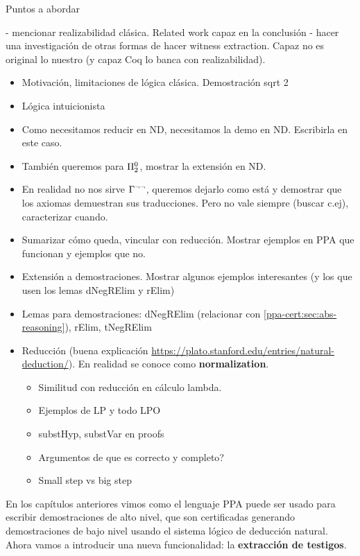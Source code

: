 Puntos a abordar

- mencionar realizabilidad clásica. Related work capaz en la conclusión
- hacer una investigación de otras formas de hacer witness extraction. Capaz no es original lo nuestro (y capaz Coq lo banca con realizabilidad).

\begin{itemize}
    \item Motivación, limitaciones de lógica clásica. Demostración sqrt 2
    \item Lógica intuicionista
    \item Como necesitamos reducir en ND, necesitamos la demo en ND. Escribirla
    en este caso.
    \item También queremos para $\Pi^0_2$, mostrar la extensión en ND.
    \item En realidad no nos sirve $\Gamma^{\neg\neg}$, queremos dejarlo como
    está y demostrar que los axiomas demuestran sus traducciones. Pero no vale
    siempre (buscar c.ej), caracterizar cuando.
    \item Sumarizar cómo queda, vincular con reducción. Mostrar ejemplos en PPA
    que funcionan y ejemplos que no.
    \item Extensión a demostraciones. Mostrar algunos ejemplos interesantes (y
    los que usen los lemas dNegRElim y rElim)
    \item Lemas para demostraciones: dNegRElim (relacionar con \ref{ppa-cert:sec:abs-reasoning}), rElim, tNegRElim
    \item Reducción (buena explicación
    \url{https://plato.stanford.edu/entries/natural-deduction/}). En realidad se
    conoce como \textbf{normalization}.
    \begin{itemize}
        \item Similitud con reducción en cálculo lambda.
        \item Ejemplos de LP y todo LPO
        \item substHyp, substVar en proofs
        \item Argumentos de que es correcto y completo?
        \item Small step vs big step
    \end{itemize}
\end{itemize}

\newpage

En los capítulos anteriores vimos como el lenguaje PPA puede ser usado para
escribir demostraciones de alto nivel, que son certificadas generando
demostraciones de bajo nivel usando el sistema lógico de deducción natural.
Ahora vamos a introducir una nueva funcionalidad: la \textbf{extracción de testigos}.

